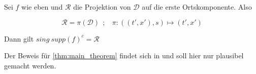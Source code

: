 \begin{corollary}
Sei $f$ wie eben und $\mathcal{R}$ die Projektion von $\mathcal{D}$ auf die erste Ortskomponente. Also

\begin{equation}
    \mathcal{R} = \pi (\mathcal{D})~~;~~~~
    \pi : ((t',x'),s) \mapsto (t',x')
\end{equation}

Dann gilt $sing ~supp (f)^c = \mathcal{R}$
\end{corollary}


Der Beweis für \cref{thm:main_theorem} findet sich in \textcite[S.19 ff]{Kutyniok2008} und soll hier nur plausibel gemacht werden.



